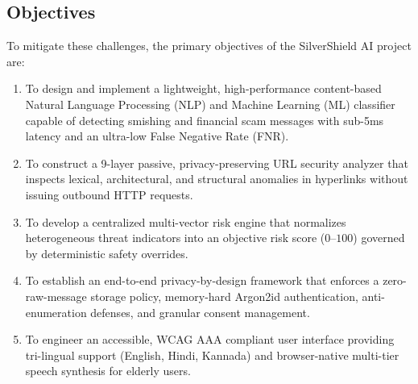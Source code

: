 \documentclass[conference]{IEEEtran}
\begin{document}
\subsection{Objectives}
To mitigate these challenges, the primary objectives of the SilverShield AI project are:
\begin{enumerate}
    \item To design and implement a lightweight, high-performance content-based Natural Language Processing (NLP) and Machine Learning (ML) classifier capable of detecting smishing and financial scam messages with sub-5ms latency and an ultra-low False Negative Rate (FNR).
    \item To construct a 9-layer passive, privacy-preserving URL security analyzer that inspects lexical, architectural, and structural anomalies in hyperlinks without issuing outbound HTTP requests.
    \item To develop a centralized multi-vector risk engine that normalizes heterogeneous threat indicators into an objective risk score ($0$--$100$) governed by deterministic safety overrides.
    \item To establish an end-to-end privacy-by-design framework that enforces a zero-raw-message storage policy, memory-hard Argon2id authentication, anti-enumeration defenses, and granular consent management.
    \item To engineer an accessible, WCAG AAA compliant user interface providing tri-lingual support (English, Hindi, Kannada) and browser-native multi-tier speech synthesis for elderly users.
\end{enumerate}
\end{document}
